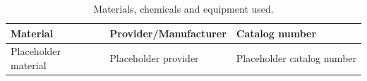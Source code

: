 \begin{table}[h]
    \centering
    \begin{tabularx}{\textwidth}{
    >{\raggedright\arraybackslash}p{}
    >{\raggedright\arraybackslash}p{}
    >{\raggedright\arraybackslash}X}
    \toprule
    \textbf{Material} & \textbf{Provider/Manufacturer} & \textbf{Catalog number} \\
    \midrule
    Placeholder material & Placeholder provider & Placeholder catalog number \\
    \bottomrule
    \end{tabularx}
    \caption{Materials, chemicals and equipment used.}
    \label{tab:materials}
\end{table}
